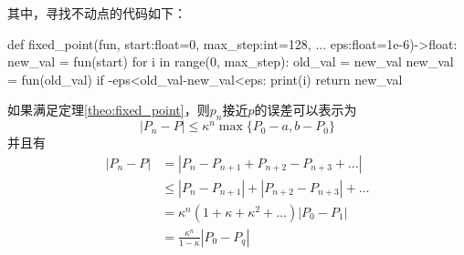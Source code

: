 其中，寻找不动点的代码如下：
\begin{python}
def fixed_point(fun, start:float=0, max_step:int=128, ...
    eps:float=1e-6)->float:
    new_val = fun(start)
    for i in range(0, max_step):
        old_val = new_val
        new_val = fun(old_val)
        if -eps<old_val-new_val<eps:
            print(i)
            return new_val
\end{python}
\begin{theo}{}
如果满足定理\ref{theo:fixed_point}，则$p_n$接近$p$的误差可以表示为
\[\left|P_n-P\right|\leq \kappa^n\max\{P_0-a,b-P_0\}\]
并且有
\begin{align*}
    \left|P_n-P\right| &= \left|P_n-P_{n+1}+P_{n+2}-P_{n+3}+\ldots\right| \\
    &\leq \left|P_n-P_{n+1}\right|+\left|P_{n+2}-P_{n+3}\right|+\ldots \\
    &=\kappa^n\left(1+\kappa+\kappa^2+\ldots\right)\left|P_0-P_1\right| \\
    &= \frac{\kappa^n}{1-\kappa}\left|P_0-P_q\right|
\end{align*}
\end{theo}

